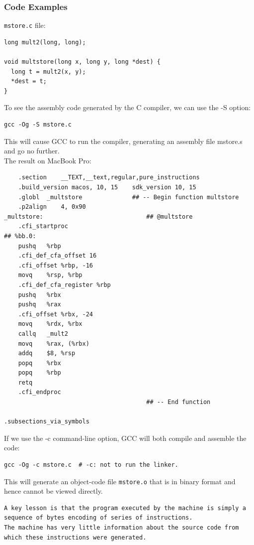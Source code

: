 \documentclass[11pt]{article}
\begin{document}
\subsubsection{Code Examples}
\label{sec:orgbb499aa}
\texttt{mstore.c} file:\\
\begin{verbatim}
long mult2(long, long);

void multstore(long x, long y, long *dest) {
  long t = mult2(x, y);
  *dest = t;
}
\end{verbatim}

To see the assembly code generated by the C compiler, we can use the -S option:\\
\begin{verbatim}
gcc -Og -S mstore.c
\end{verbatim}
This will cause GCC to run the compiler, generating an assembly file mstore.s and go no further.\\

The result on MacBook Pro:\\
\begin{verbatim}
	.section	__TEXT,__text,regular,pure_instructions
	.build_version macos, 10, 15	sdk_version 10, 15
	.globl	_multstore              ## -- Begin function multstore
	.p2align	4, 0x90
_multstore:                             ## @multstore
	.cfi_startproc
## %bb.0:
	pushq	%rbp
	.cfi_def_cfa_offset 16
	.cfi_offset %rbp, -16
	movq	%rsp, %rbp
	.cfi_def_cfa_register %rbp
	pushq	%rbx
	pushq	%rax
	.cfi_offset %rbx, -24
	movq	%rdx, %rbx
	callq	_mult2
	movq	%rax, (%rbx)
	addq	$8, %rsp
	popq	%rbx
	popq	%rbp
	retq
	.cfi_endproc
                                        ## -- End function

.subsections_via_symbols
\end{verbatim}

If we use the -c command-line option, GCC will both compile and assemble the code:\\
\begin{verbatim}
gcc -Og -c mstore.c  # -c: not to run the linker.
\end{verbatim}
This will generate an object-code file \texttt{mstore.o} that is in binary format and hence cannot be viewed directly.\\

\begin{verbatim}
A key lesson is that the program executed by the machine is simply a sequence of bytes encoding of series of instructions. 
The machine has very little information about the source code from which these instructions were generated.
\end{verbatim}
\end{document}
